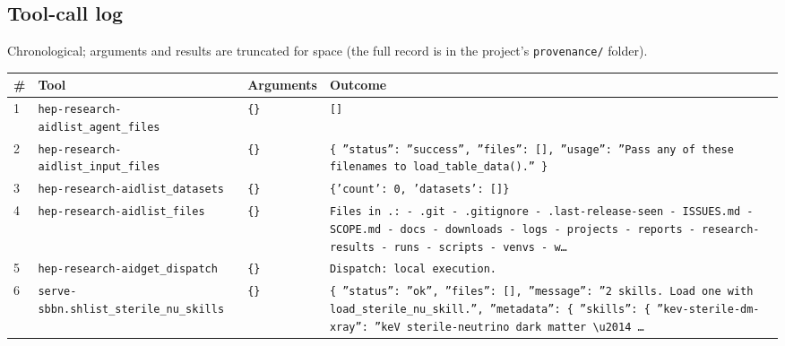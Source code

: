 \documentclass[11pt,a4paper]{article}
\begin{document}
\subsection{Tool-call log}
Chronological; arguments and results are truncated for space (the full record is in the project's \texttt{provenance/} folder).
\begin{longtable}{@{}p{}p{}p{}p{}@{}}
\toprule \# & Tool & Arguments & Outcome \\ \midrule \endhead
1 & \texttt{hep-research-aid}\newline\texttt{list\_\allowbreak{}agent\_\allowbreak{}files} & \texttt{\{\}\allowbreak{}} & \texttt{[]\allowbreak{}} \\
2 & \texttt{hep-research-aid}\newline\texttt{list\_\allowbreak{}input\_\allowbreak{}files} & \texttt{\{\}\allowbreak{}} & \texttt{\{   ''status'':\allowbreak{} ''success'',\allowbreak{}   ''files'':\allowbreak{} []\allowbreak{},\allowbreak{}   ''usage'':\allowbreak{} ''Pass any of these filenames to load\_\allowbreak{}table\_\allowbreak{}data()\allowbreak{}.'' \}\allowbreak{}} \\
3 & \texttt{hep-research-aid}\newline\texttt{list\_\allowbreak{}datasets} & \texttt{\{\}\allowbreak{}} & \texttt{\{'count':\allowbreak{} 0,\allowbreak{} 'datasets':\allowbreak{} []\allowbreak{}\}\allowbreak{}} \\
4 & \texttt{hep-research-aid}\newline\texttt{list\_\allowbreak{}files} & \texttt{\{\}\allowbreak{}} & \texttt{Files in .:\allowbreak{}   - .git   - .gitignore   - .last-release-seen   - ISSUES.md   - SCOPE.md   - docs   - downloads   - logs   - projects   - reports   - research-results   - runs   - scripts   - venvs   - w\ldots{}\allowbreak{}} \\
5 & \texttt{hep-research-aid}\newline\texttt{get\_\allowbreak{}dispatch} & \texttt{\{\}\allowbreak{}} & \texttt{Dispatch:\allowbreak{} local execution.} \\
6 & \texttt{serve-sbbn.sh}\newline\texttt{list\_\allowbreak{}sterile\_\allowbreak{}nu\_\allowbreak{}skills} & \texttt{\{\}\allowbreak{}} & \texttt{\{   ''status'':\allowbreak{} ''ok'',\allowbreak{}   ''files'':\allowbreak{} []\allowbreak{},\allowbreak{}   ''message'':\allowbreak{} ''2 skills. Load one with load\_\allowbreak{}sterile\_\allowbreak{}nu\_\allowbreak{}skill.'',\allowbreak{}   ''metadata'':\allowbreak{} \{     ''skills'':\allowbreak{} \{       ''kev-sterile-dm-xray'':\allowbreak{} ''keV sterile-neutrino dark matter \textbackslash{}\allowbreak{}u2014 \ldots{}\allowbreak{}} \\

\end{longtable}
\end{document}
